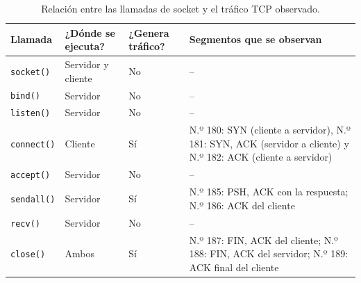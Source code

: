 \documentclass[11pt,a4paper]{article}
\begin{document}
\begin{enumerate}[label=\alph*)]
\begin{table}[H]
  \centering
  \renewcommand{\arraystretch}{1.5}
  \begin{tabularx}{\textwidth}{|>{\raggedright\arraybackslash}p{2.3cm}|>{\raggedright\arraybackslash}p{2.5cm}|>{\raggedright\arraybackslash}p{2.6cm}|X|}
    \hline
    \textbf{Llamada} & \textbf{¿Dónde se ejecuta?} & \textbf{¿Genera tráfico?} & \textbf{Segmentos que se observan} \\ \hline
    \texttt{socket()} & Servidor y cliente & No & -- \\ \hline
    \texttt{bind()} & Servidor & No & -- \\ \hline
    \texttt{listen()} & Servidor & No & -- \\ \hline
    \texttt{connect()} & Cliente & Sí & N.º 180: SYN (cliente a servidor), N.º 181: SYN, ACK (servidor a cliente) y N.º 182: ACK (cliente a servidor) \\ \hline
    \texttt{accept()} & Servidor & No & -- \\ \hline
    \texttt{sendall()} & Servidor & Sí & N.º 185: PSH, ACK con la respuesta; N.º 186: ACK del cliente \\ \hline
    \texttt{recv()} & Servidor & No & -- \\ \hline
    \texttt{close()} & Ambos & Sí & N.º 187: FIN, ACK del cliente; N.º 188: FIN, ACK del servidor; N.º 189: ACK final del cliente \\ \hline
  \end{tabularx}
  \caption{Relación entre las llamadas de socket y el tráfico TCP observado.}
  \label{tab:tp5-llamadas-trafico}
\end{table}


\end{enumerate}
\end{document}
